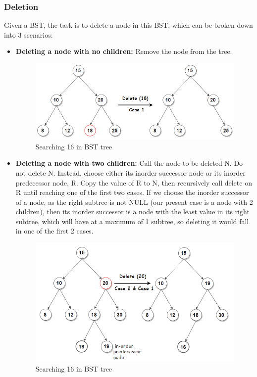 \documentclass[11pt]{article}
\begin{document}
        
        \subsubsection{Deletion}
        Given a BST, the task is to delete a node in this BST, which can be broken down into 3 scenarios:
        \begin{itemize}
            \item \textbf{Deleting a node with no children:} Remove the node from the tree.
        \begin{figure}[H]
            \centering
            \includegraphics[scale=0.7]{DeletionBSTC1.png}
            \caption{Searching 16 in BST tree}\label{DeletionBSTC1}
        \end{figure}

            \item \textbf{Deleting a node with two children:} Call the node to be deleted N. Do not delete N. Instead, choose either its inorder successor node or its inorder predecessor node, R. Copy the value of R to N, then recursively call delete on R until reaching one of the first two cases. If we choose the inorder successor of a node, as the right subtree is not NULL (our present case is a node with 2 children), then its inorder successor is a node with the least value in its right subtree, which will have at a maximum of 1 subtree, so deleting it would fall in one of the first 2 cases.

        \begin{figure}[H]
            \centering
            \includegraphics[scale=0.7]{DeletionBSTC2.png}
            \caption{Searching 16 in BST tree}\label{DeletionBSTC2}
        \end{figure}


\end{itemize}
\end{document}
